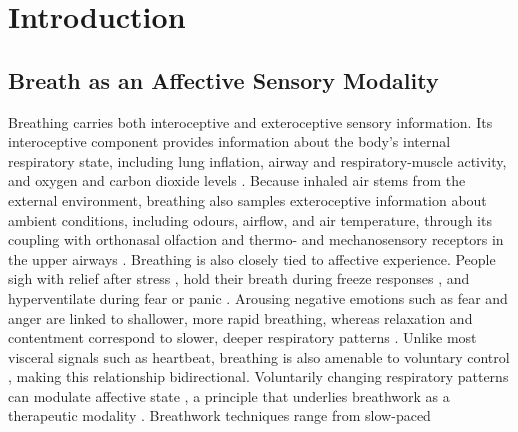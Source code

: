 \section{Introduction}\label{sec:intro}


\subsection{Breath as an Affective Sensory Modality}
Breathing carries both interoceptive and exteroceptive sensory information. Its
interoceptive component provides information about the body's internal
respiratory state, including lung inflation, airway and respiratory-muscle
activity, and oxygen and carbon dioxide levels
\citep{chan2024respiratory, engelen2023interoceptive,
weng2021interventions}. Because inhaled air stems from the external
environment, breathing also samples exteroceptive information about ambient
conditions, including odours, airflow, and air temperature, through its
coupling with orthonasal olfaction and thermo- and mechanosensory receptors in
the upper airways \citep{mori2022stress, mori2022processing,
zhou2011sensitivity, sabnis2008human, kytikova2021thermosensory}. Breathing is
also closely tied to affective experience. People sigh with relief after stress
\citep{Balban2023}, hold their breath during freeze responses
\citep{boiten1994emotions}, and hyperventilate during fear or panic
\citep{jerath2020respiratory, kreibig2010autonomic}. Arousing negative emotions
such as fear and anger are linked to shallower, more rapid breathing, whereas
relaxation and contentment correspond to slower, deeper respiratory patterns
\citep{boiten1994emotions, homma2008breathing, jerath2020respiratory}. Unlike
most visceral signals such as heartbeat, breathing is also amenable to
voluntary control \citep{sarkar2017functional}, making this relationship
bidirectional. Voluntarily changing respiratory patterns can modulate affective
state \citep{jerath2020respiratory, ashhad2022breathing}, a principle that
underlies breathwork as a therapeutic modality \citep{fincham2023effect,
Balban2023, Siebieszuk2025}. Breathwork techniques range from slow-paced
